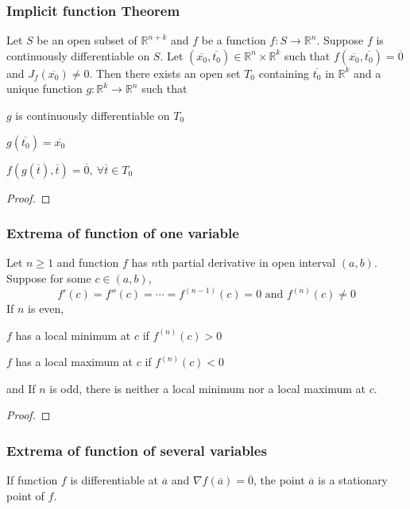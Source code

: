 \subsubsection{Implicit function Theorem}
\begin{theorem}
Let $S$ be an open subset of $\mathbb{R}^{n+k}$ and $f$ be a function $f : S \to \mathbb{R}^n$. Suppose $f$ is continuously differentiable on $S$. Let $(\overline{x_0},\overline{t_0}) \in \mathbb{R}^n \times \mathbb{R}^k$ such that $f(\overline{x_0},\overline{t_0}) = \overline{0}$ and $J_f(\overline{x_0}) \ne 0$. Then there exists an open set $T_0$ containing $\overline{t_0}$ in $\mathbb{R}^k$ and a unique function $g : \mathbb{R}^k \to \mathbb{R}^n$ such that \begin{enumerate*} \item $g$ is continuously differentiable on $T_0$ \item $g(\overline{t_0}) = \overline{x_0}$ \item $f(g(\overline{t}),\overline{t}) = \overline{0},\ \forall \overline{t} \in T_0$ \end{enumerate*}
\end{theorem}
\begin{proof}
\end{proof}

\subsubsection{Extrema of function of one variable}
\begin{theorem}
	Let $n \ge 1$ and function $f$ has $n$th partial derivative in open interval $(a,b)$. Suppose for some $c \in (a,b)$,
	\[ f'(c) = f''(c) = \cdots = f^{(n-1)}(c) = 0 \text{ and } f^{(n)}(c) \ne 0 \]
If $n$ is even, \begin{enumerate*} \item $f$ has a local minimum at $c$ if $f^{(n)}(c)>0$ \item $f$ has a local maximum at $c$ if $f^{(n)}(c) < 0$ \end{enumerate*} and If $n$ is odd, there is neither a local minimum nor a local maximum at $c$.
\end{theorem}
\begin{proof}
\end{proof}

\subsubsection{Extrema of function of several variables}
\begin{definition}
	If function $f$ is differentiable at $\overline{a}$ and $\nabla f(\overline{a}) = \overline{0}$, the point $\overline{a}$ is a stationary point of $f$.
\end{definition}


